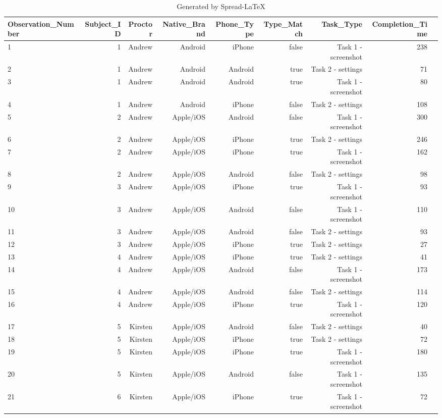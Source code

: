 \documentclass[conference]{IEEEtran}
\begin{document}
\begin{table}[!htp]\centering
\caption{Generated by Spread-LaTeX}\label{tab: }
\scriptsize
\begin{tabular}{lrrrrrrrr}\toprule
Observation\_Number &Subject\_ID &Proctor &Native\_Brand &Phone\_Type &Type\_Match &Task\_Type &Completion\_Time \\\midrule
1 &1 &Andrew &Android &iPhone &false &Task 1 - screenshot &238 \\
2 &1 &Andrew &Android &Android &true &Task 2 - settings &71 \\
3 &1 &Andrew &Android &Android &true &Task 1 - screenshot &80 \\
4 &1 &Andrew &Android &iPhone &false &Task 2 - settings &108 \\
5 &2 &Andrew &Apple/iOS &Android &false &Task 1 - screenshot &300 \\
6 &2 &Andrew &Apple/iOS &iPhone &true &Task 2 - settings &246 \\
7 &2 &Andrew &Apple/iOS &iPhone &true &Task 1 - screenshot &162 \\
8 &2 &Andrew &Apple/iOS &Android &false &Task 2 - settings &98 \\
9 &3 &Andrew &Apple/iOS &iPhone &true &Task 1 - screenshot &93 \\
10 &3 &Andrew &Apple/iOS &Android &false &Task 1 - screenshot &110 \\
11 &3 &Andrew &Apple/iOS &Android &false &Task 2 - settings &93 \\
12 &3 &Andrew &Apple/iOS &iPhone &true &Task 2 - settings &27 \\
13 &4 &Andrew &Apple/iOS &iPhone &true &Task 2 - settings &41 \\
14 &4 &Andrew &Apple/iOS &Android &false &Task 1 - screenshot &173 \\
15 &4 &Andrew &Apple/iOS &Android &false &Task 2 - settings &114 \\
16 &4 &Andrew &Apple/iOS &iPhone &true &Task 1 - screenshot &120 \\
17 &5 &Kirsten &Apple/iOS &Android &false &Task 2 - settings &40 \\
18 &5 &Kirsten &Apple/iOS &iPhone &true &Task 2 - settings &72 \\
19 &5 &Kirsten &Apple/iOS &iPhone &true &Task 1 - screenshot &180 \\
20 &5 &Kirsten &Apple/iOS &Android &false &Task 1 - screenshot &135 \\
21 &6 &Kirsten &Apple/iOS &iPhone &true &Task 1 - screenshot &72 \\

\end{tabular}
\end{table}
\end{document}
